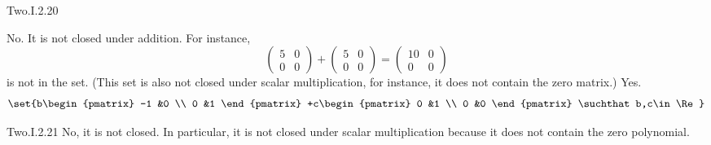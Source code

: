 \begin{ans}{Two.I.2.20}
\begin{exparts}
\begin{equation*}
          \end{equation*}
        \partsitem No.
          It is not closed under addition.
          For instance,
          \begin{equation*}
            \begin{pmatrix}
              5  &0  \\
              0  &0
            \end{pmatrix}
            +\begin{pmatrix}
              5  &0  \\
              0  &0
            \end{pmatrix}
            =\begin{pmatrix}
              10  &0  \\
              0  &0
            \end{pmatrix}
          \end{equation*}
          is not in the set.
          (This set is also not closed under scalar multiplication,
          for instance, it does not contain the zero matrix.)
        \partsitem Yes.
          \begin{equation*}
            \set{b\begin{pmatrix}
                    -1  &0  \\
                    0   &1
                  \end{pmatrix}
                 +c\begin{pmatrix}
                    0  &1  \\
                    0  &0
                   \end{pmatrix}
                 \suchthat b,c\in\Re}
          \end{equation*}
      \end{exparts}
     
\end{ans}
\begin{ans}{Two.I.2.21}
      No, it is not closed.
      In particular, it is not closed under scalar multiplication because it
      does not contain the zero polynomial.
    
\end{ans}
